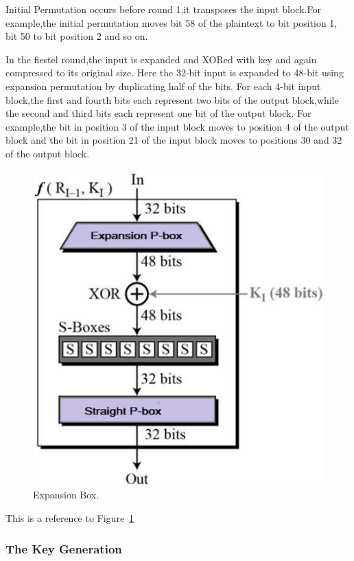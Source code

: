 \documentclass[11pt]{article}
\begin{document}
Initial Permutation occurs before round 1,it transposes the input block.For example,the initial permutation moves bit 58 of the plaintext to bit position 1,
bit 50 to bit position 2 and so on.

     In the fiestel round,the input is expanded and XORed with key and again compressed to its original size.
     Here the 32-bit input is expanded to 48-bit using expansion permutation by duplicating half of the bits.
     For each 4-bit input block,the first and fourth bits each represent two bits of the output block,while the second and third bits each represent one bit of the output block.
     For example,the bit in position 3 of the input block moves to position 4 of the output block and the bit in position 21 of the input block moves to positions 30 and 32 of the 
     output block.

\begin{figure}     
\begin{center}
\includegraphics[scale=0.3]{round_function.jpg}
\end{center}
\caption{Expansion Box.}\label{Fiestal Round}
\end{figure}
This is a reference to Figure~\ref{Fiestal Round} \cite{source1}

\subsubsection{The Key Generation}
  
\end{document}
